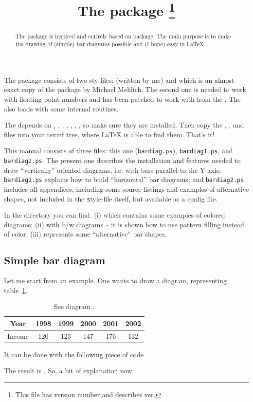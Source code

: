 \documentclass[12pt]{article}
\title{The \bard package
       \thanks{This file has version number \barvers and describes \bard ver.\barvers}
}
\begin{document}
\maketitle
\begin{abstract}
The \bard package is inspired and entirely based on \pst package.
The main purpose is to make the drawing of (simple) 
bar diagrams possible and (I hope) easy  in La\TeX{}.  
\end{abstract}



The \bard package consists of two sty-files: 
 (written by me)
and  which is an almost exact copy of 
the  package
by Michael Mehlich. The second one is needed to work with floating
point numbers and has been patched to work with  from the
\pst. The  also loads  with some 
internal routines.

The \bard depends on , , ,
, , , , 
so make sure they are installed. Then copy 
the , , and  
files into your texmf tree,
where La\TeX{} is able to find them. That's it!

This manual consists of three files: this one (\texttt{bardiag.ps}), 
\texttt{bardiag1.ps}, and \texttt{bardiag2.ps}.
The present one describes the installation and features needed to draw
``vertically'' oriented diagrams, i.e. with bars parallel to 
the Y-axis; \texttt{bardiag1.ps}  explains how to build ``horizontal''
bar diagrams; and \texttt{bardiag2.ps} includes all appendices,
including some source listings and examples of alternative shapes, not
included in the \bard\texttt style-file itself, but available as a config file.

In the  directory you can find: (i)  which
contains some examples of colored diagrams; (ii)  with b/w
diagrams -- it is shown how to use pattern filling instead of color; (iii)
 represents some ``alternative'' bar shapes.


\subsection{Simple bar diagram \label{sec:2.1}}
Let me start from an example. One wants to draw a diagram, representing table~\ref{tab:1}.
\begin{table}[!h]\centering
\begin{tabular}{c||ccccc}
Year    & 1998 & 1999 & 2000 & 2001 & 2002 \\\hline
Income  & 120  & 123  & 147  & 176  & 132
\end{tabular}
\caption{\label{tab:1} See diagram .}
\end{table}
%  
It can be done with the following piece of code

The result is . 
So, a bit of explanation now.
\end{document}
